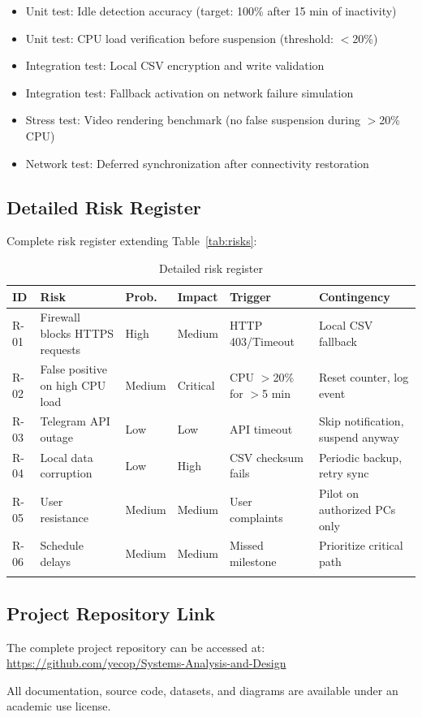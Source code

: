 \documentclass[12pt,a4paper]{article}
\begin{document}
\begin{itemize}
    \item Unit test: Idle detection accuracy (target: 100\% after 15 min of inactivity)
    \item Unit test: CPU load verification before suspension (threshold: $<$20\%)
    \item Integration test: Local CSV encryption and write validation
    \item Integration test: Fallback activation on network failure simulation
    \item Stress test: Video rendering benchmark (no false suspension during $>$20\% CPU)
    \item Network test: Deferred synchronization after connectivity restoration
\end{itemize}

\subsection{Detailed Risk Register}
Complete risk register extending Table~\ref{tab:risks}:

\begin{longtable}{|p{1cm}|p{3cm}|p{2cm}|p{2cm}|p{2cm}|p{2.5cm}|}
\hline
\textbf{ID} & \textbf{Risk} & \textbf{Prob.} & \textbf{Impact} & \textbf{Trigger} & \textbf{Contingency} \\
\hline
R-01 & Firewall blocks HTTPS requests & High & Medium & HTTP 403/Timeout & Local CSV fallback \\
\hline
R-02 & False positive on high CPU load & Medium & Critical & CPU $>$20\% for $>$5 min & Reset counter, log event \\
\hline
R-03 & Telegram API outage & Low & Low & API timeout & Skip notification, suspend anyway \\
\hline
R-04 & Local data corruption & Low & High & CSV checksum fails & Periodic backup, retry sync \\
\hline
R-05 & User resistance & Medium & Medium & User complaints & Pilot on authorized PCs only \\
\hline
R-06 & Schedule delays & Medium & Medium & Missed milestone & Prioritize critical path \\
\hline
\caption{Detailed risk register}
\label{tab:risk_register}
\end{longtable}

\subsection{Project Repository Link}
The complete project repository can be accessed at: \url{https://github.com/yecop/Systems-Analysis-and-Design}

All documentation, source code, datasets, and diagrams are available under an academic use license.
\end{document}
